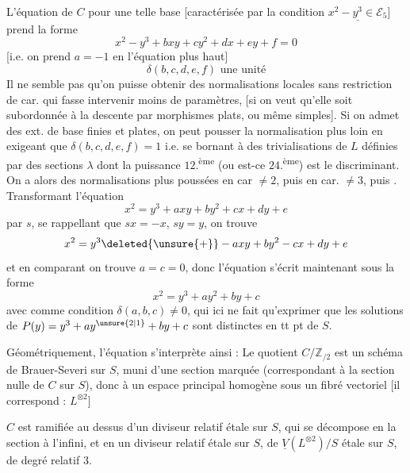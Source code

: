 L'équation de $C$ pour une telle base  [caractérisée par la condition $\underline{x^2-y^3\in\mathcal E_5}$] prend la forme
\[
x^2-y^3+bxy+cy^2+dx+ey+f=0
\]
[i.e. on prend $a=-1$ en l'équation plus haut]
\[
\boxed{\delta(b,c,d,e,f)\text{ une unité}}
\]
Il ne semble pas qu'on puisse obtenir des normalisations locales sans  restriction de car. qui fasse intervenir moins de paramètres, [si on veut qu'elle soit subordonnée à la descente  par morphismes plats, ou même simples]. Si on admet des ext. de base finies et plates, on peut pousser la normalisation plus loin en exigeant que  $\delta(b,c,d,e,f)=1$ i.e.  se bornant à des trivialisations de $L$  définies par des sections $\lambda$ dont la puissance $12$.\textsuperscript{ème} (ou est-ce $24$.\textsuperscript{ème}) est  le discriminant. On a  alors des  normalisations plus poussées en car $\ne2$, puis en car. $\ne3$, puis .
Transformant l'équation
\[
x^2=y^3+axy+by^2+cx+dy+e
\]
par $s$,  se rappellant que $sx=-x$, $sy=y$, on trouve
\[
x^2=y^3\deleted{\unsure{+}}-axy+by^2-cx+dy+e
\]
et en comparant on trouve $a=c=0$, donc l'équation s'écrit maintenant sous la forme
\[
\boxed{x^2=y^3+ay^2+by+c}
\]
avec comme condition $\delta(a,b,c)\ne0$, qui ici ne fait qu'exprimer que les solutions de $P(y)=y^3+ay^{\unsure{2|1}}+by+c$ sont distinctes en tt pt de $S$.

Géométriquement,  l'équation s'interprète ainsi : Le quotient $C/\mathbb Z_{/2}$ est un schéma de Brauer-Severi  sur $S$, muni d'une section marquée (correspondant à la section nulle de $C$ sur $S$), donc    à un espace principal homogène sous un   fibré vectoriel   [il correspond : $L^{\otimes2}$]

$C$ est ramifiée  au dessus d'un diviseur relatif  étale sur $S$, qui se décompose en la section à l'infini, et en un diviseur  relatif  étale sur $S$,  de  $\underline V(L^{\otimes2})/S$ étale sur $S$, de degré relatif 3.

